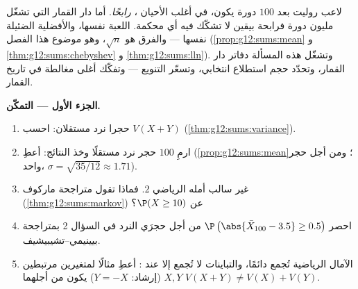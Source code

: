 \begin{problem}
\label{pb:g12:sums:1}
لاعب روليت بعد $100$ دورة يكون، في أغلب الأحيان ،
\emph{رابحًا}. أما دار القمار التي تشغّل مليون دورة فرابحة
بيقين لا تشكّك فيه أي محكمة. اللعبة نفسها، والأفضلية الضئيلة نفسها ---
والفرق هو $\sqrt n$، وهو موضوع هذا
الفصل (\cref{prop:g12:sums:mean} و
\cref{thm:g12:sums:chebyshev} و \cref{thm:g12:sums:lln}). وتشغّل هذه
المسألة دفاتر دار القمار، وتحدّد حجم استطلاع انتخابي، وتسعّر
التنويع --- وتفكّك أغلى مغالطة في
تاريخ القمار.

\medskip
\noindent\textbf{الجزء الأول --- التمكّن.}
\begin{enumerate}
  \item حجرا نرد مستقلان: احسب $V(X + Y)$
        (\cref{thm:g12:sums:variance}).
  \item ارمِ $100$ حجر نرد مستقلًا وخذ  النتائج:
        أعطِ    (\cref{prop:g12:sums:mean}؛ ومن أجل حجر واحد،
        $\sigma = \sqrt{35/12} \approx 1.71$).
  \item {} غير سالب أمله الرياضي $2$.
        فماذا تقول متراجحة ماركوف
        (\cref{thm:g12:sums:markov}) عن
        $\P(X \geq 10)$؟
  \item احصر $\P\left(\abs{\bar X_{100} - 3.5} \geq
        0.5\right)$ من أجل  حجرَي النرد في السؤال 2 بمتراجحة
        بيينيمي--تشيبيشيف.
  \item الآمال الرياضية تُجمع دائمًا، والتباينات لا تُجمع إلا عند
        : أعطِ مثالًا لمتغيرين مرتبطين $X, Y$ (إرشاد:
        $Y = -X$) يكون من أجلهما
        $V(X + Y) \neq V(X) + V(Y)$.
\end{enumerate}


\end{problem}
